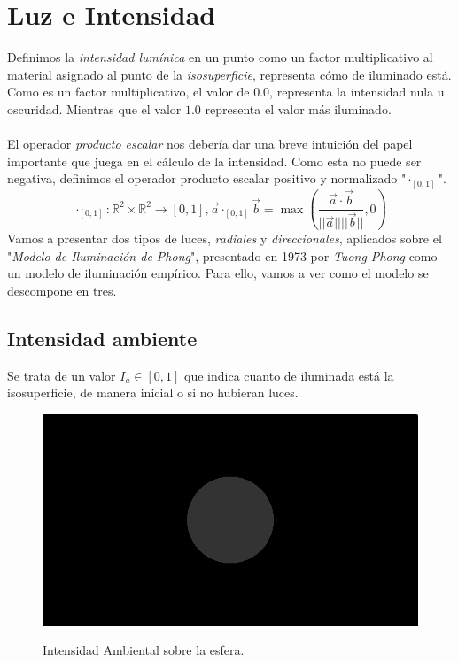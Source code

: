\section{Luz e Intensidad}
 Definimos la \textit{intensidad lumínica} en un punto como un factor multiplicativo al material asignado al punto de la \textit{isosuperficie}, representa cómo de iluminado está. Como es un factor multiplicativo, el valor de \(0.0\), representa la intensidad nula u oscuridad. Mientras que el valor \(1.0\) representa el valor más iluminado.\\\\ 
El operador \textit{producto escalar} nos debería dar una breve intuición del papel importante que juega en el cálculo de la intensidad. Como esta no puede ser negativa, definimos el operador producto escalar positivo y normalizado "\(\cdot_{[0,1]}\)".
\[\cdot_{[0,1]}:\mathbb{R}^2\times\mathbb{R}^2\longrightarrow[0,1], \Vec{a}\cdot_{[0,1]}\Vec{b}=\max\left(\dfrac{\Vec{a}\cdot \Vec{b}}{\vert\vert\Vec{a}\vert\vert\vert\vert \Vec{b}\vert\vert}, 0\right)\]
Vamos a presentar dos tipos de luces, \textit{radiales} y \textit{direccionales}, aplicados sobre  el "\textit{Modelo de Iluminación de Phong}", presentado en 1973 por \textit{Tuong Phong} como un modelo de iluminación empírico. Para ello, vamos a ver como el modelo se descompone en tres. 
\subsection{Intensidad ambiente}
Se trata de un valor \(I_a \in [0,1]\) que indica cuanto de iluminada está la isosuperficie, de manera inicial o si no hubieran luces. 
\begin{figure}[H]
  \centering
  \captionsetup{justification=centering}%
   \includegraphics[width=1.0\textwidth]{secciones/imagenes/lightmodel/ambiental.png}\label{fig:ambient}
  \caption{Intensidad Ambiental sobre la esfera.}
\end{figure}


